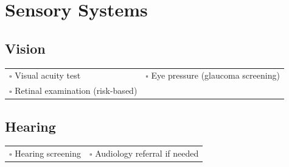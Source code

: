 
\section{Sensory Systems}
\label{sec:sensory}

\subsection{Vision}

\begin{tabular}{p{9cm} p{8cm}}
$\square$ Visual acuity test & $\square$ Eye pressure (glaucoma screening) \\ 
$\square$ Retinal examination (risk-based) & \\ 
\end{tabular}

\subsection{Hearing}

\begin{tabular}{p{9cm} p{8cm}}
$\square$ Hearing screening & $\square$ Audiology referral if needed \\ 
\end{tabular}

